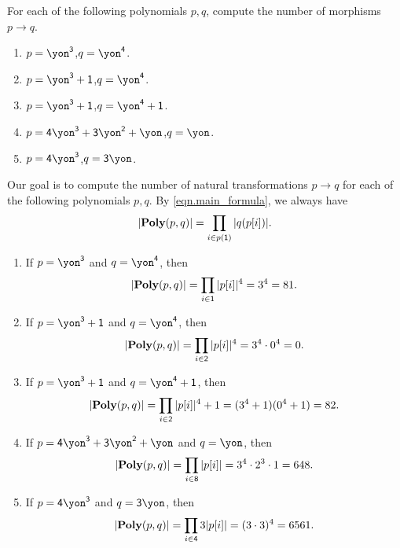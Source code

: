 \documentclass[Book-Poly]{subfiles}
\begin{document}
\begin{exercise}
For each of the following polynomials $p,q$, compute the number of morphisms $p\to q$.
\begin{enumerate}
	\item $p=\yon^\3$,\quad $q=\yon^\4$.
	\item $p=\yon^\3+\1$,\quad $q=\yon^\4$.
	\item $p=\yon^\3+\1$,\quad $q=\yon^\4+\1$.
	\item $p=\4\yon^\3+\3\yon^\2+\yon$,\quad $q=\yon$.
	\item $p=\4\yon^\3$,\quad $q=\3\yon$.
\qedhere
\end{enumerate}
\begin{solution}
Our goal is to compute the number of natural transformations $p\to q$ for each of the following polynomials $p,q$.
By \eqref{eqn.main_formula}, we always have
\[
    |\mathbf{Poly}(p, q)| = \prod_{i \in p(\textsf{1})} |q(p[i])|.
\]
\begin{enumerate}
	\item If $p=\yon^\3$ and $q=\yon^\4$, then
	\[
	    |\mathbf{Poly}(p, q)| = \prod_{i \in \textsf{1}} |p[i]|^4 = 3^4 = 81.
	\]
	\item If $p=\yon^\3+\1$ and $q=\yon^\4$, then
	\[
	    |\mathbf{Poly}(p, q)| = \prod_{i \in \textsf{2}} |p[i]|^4 = 3^4 \cdot 0^4 = 0.
	\]
	\item If $p=\yon^\3+\1$ and $q=\yon^\4+\1$, then
	\[
	    |\mathbf{Poly}(p, q)| = \prod_{i \in \textsf{2}} |p[i]|^4 + 1 = (3^4 + 1)(0^4 + 1) = 82.
	\]
	\item If $p=\4\yon^\3+\3\yon^\2+\yon$ and $q=\yon$, then
	\[
	    |\mathbf{Poly}(p, q)| = \prod_{i \in \textsf{8}} |p[i]| = 3^4 \cdot 2^3 \cdot 1 = 648.
	\]
	\item If $p=\4\yon^\3$ and $q=\3\yon$, then
	\[
	    |\mathbf{Poly}(p, q)| = \prod_{i \in \textsf{4}} 3|p[i]| = (3 \cdot 3)^4 = 6561.
	\]
\qedhere
\end{enumerate}
\end{solution}
\end{exercise}
\end{document}

